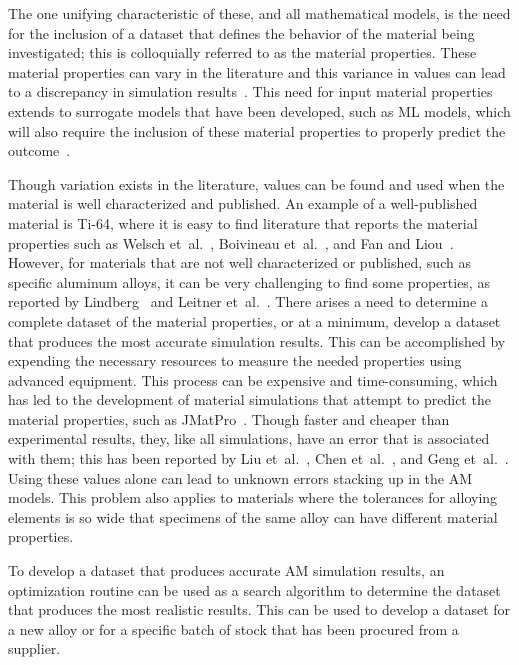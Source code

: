 \documentclass[metals,article,accept,pdftex,moreauthors]{Definitions/mdpi}
\begin{document}
The one unifying characteristic of these, and all mathematical models, is the need for the 
inclusion of a dataset that defines the behavior of the material being investigated; this is 
colloquially referred to as the material properties.  These material properties can vary in 
the literature and this variance in values can lead to a discrepancy in simulation 
results~\cite{daryabeigiThermalPropertiesAccurate2011}.
This need for input material properties extends to surrogate models that have been developed, such as \ac{ML} models, which will also require the inclusion of these material properties to properly predict the outcome~\cite{zhuMachineLearningMetal2020, zobeiryPhysicsinformedMachineLearning2021, mengMachineLearningAdditive2020, wangMachineLearningAdditive2020}.

Though variation exists in the literature, values can be found and used when the material 
is well characterized and published.  An example of a well-published material is Ti-64, 
where it is easy to find literature that reports the material properties such as Welsch 
et~al.~\cite{welschgerhard_1993}, Boivineau et~al.~\cite{boivineau_2006}, and Fan and 
Liou~\cite{fan_2012}.  However, for materials that are not well characterized or published, 
such as specific aluminum alloys, it can be very challenging to find some properties, as 
reported by Lindberg~\cite{lundberg_material_1994} and Leitner 
et~al.~\cite{leitner_thermophysical_2017}.  There arises a need to determine a complete 
dataset of the material properties, or at a minimum, develop a dataset that produces the 
most accurate simulation results. 
This can be accomplished by expending the necessary resources to measure the needed properties using advanced equipment.
This process can be expensive and time-consuming, which has led to the development of 
material simulations that attempt to predict the material properties, such as 
JMatPro~\cite{jmatpro}.  Though faster and cheaper than experimental results, they, like 
all simulations, have an error that is associated with them; this has been reported by Liu 
et~al.~\cite{liuStudyPredictionTensile2020}, Chen 
et~al.~\cite{chenMicrostructurePropertiesIronbased2023}, and Geng 
et~al.~\cite{gengDatadrivenMachineLearning2022}.  Using these values alone can lead to 
unknown errors stacking up in the \ac{AM} models.
This problem also applies to materials where the tolerances for alloying elements is so 
wide that specimens of the same alloy can have different material properties.  

To develop a dataset that produces accurate \ac{AM} simulation results, an optimization routine can be used as a search algorithm to determine the dataset that produces the most realistic results.  This can be used to develop a dataset for a new alloy or for a specific batch of stock that has been procured from a supplier. 
\end{document}
